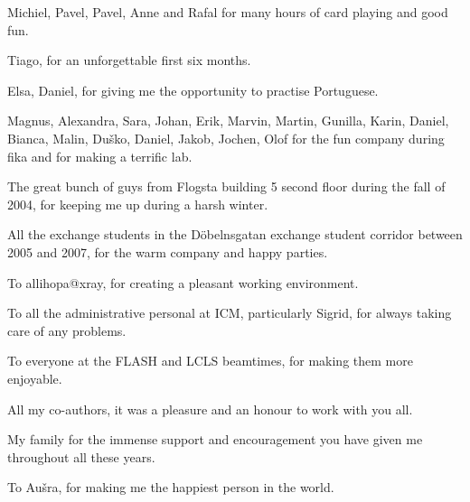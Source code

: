 \noindent
Michiel, Pavel, Pavel, Anne and Rafal for many hours of card playing and good fun.
\vspace{0.5cm}

\noindent
Tiago, for an unforgettable first six months.
\vspace{0.5cm}

\noindent
Elsa, Daniel, for giving me the opportunity to practise Portuguese.
\vspace{0.5cm}

\noindent
Magnus, Alexandra, Sara, Johan, Erik, Marvin, Martin, Gunilla, Karin,
Daniel, Bianca, Malin, Du\v{s}ko, Daniel, Jakob, Jochen, Olof for the fun company during
fika and for making a terrific lab.
\vspace{0.5cm}

\noindent 
The great bunch of guys from Flogsta building 5 second floor during the fall of
2004, for keeping me up during a harsh winter.
\vspace{0.5cm}
 
\noindent
All the exchange students in the D\"obelnsgatan exchange student corridor between 
2005 and 2007, for the warm company and happy parties.
\vspace{0.5cm}
 
\noindent
To allihopa@xray, for creating a pleasant working environment.
\vspace{0.5cm}

\noindent
To all the administrative personal at ICM, particularly Sigrid, for always
taking care of any problems.
\vspace{0.5cm}

\noindent
To everyone at the FLASH and LCLS beamtimes, for making them more enjoyable.
\vspace{0.5cm}

\noindent
All my co-authors, it was a pleasure and an honour to work with you all.
\vspace{0.5cm}

\noindent
My family for the immense support and encouragement you have given me
throughout all these years.
\vspace{0.5cm}

\noindent
To Au\v{s}ra, for making me the happiest person in the world.
